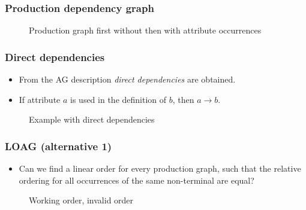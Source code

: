 \documentclass{beamer}
\begin{document}
\begin{frame}
    \frametitle{Production dependency graph}
    \begin{itemize}
    \end{itemize}
    \begin{figure}

        \caption{Production graph first without then with attribute occurrences}
    \end{figure}
\end{frame}

\begin{frame}
    \frametitle{Direct dependencies}
    \begin{itemize}
        \item From the AG description \emph{direct dependencies} are obtained.
        \item If attribute $a$ is used in the definition of $b$, then $a\rightarrow b$.
    \end{itemize}
    \begin{figure}
    
        \caption{Example with direct dependencies}
    \end{figure}
\end{frame}


\begin{frame}
    \frametitle{LOAG (alternative 1)}
    \begin{itemize}
        \item Can we find a linear order for every production graph,
              such that the relative ordering for all occurrences of the same
                non-terminal are equal?
    \end{itemize}
    \begin{figure}
        \caption{Working order, invalid order}
    \end{figure}
\end{frame}
\end{document}
